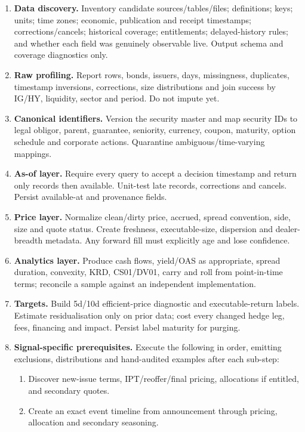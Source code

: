 \documentclass[10pt]{article}
\begin{document}
\begin{enumerate}[leftmargin=2em,label=\textbf{A\arabic*.}]
\item \textbf{Data discovery.} Inventory candidate sources/tables/files; definitions; keys; units; time zones; economic, publication and receipt timestamps; corrections/cancels; historical coverage; entitlements; delayed-history rules; and whether each field was genuinely observable live. Output schema and coverage diagnostics only.
\item \textbf{Raw profiling.} Report rows, bonds, issuers, days, missingness, duplicates, timestamp inversions, corrections, size distributions and join success by IG/HY, liquidity, sector and period. Do not impute yet.
\item \textbf{Canonical identifiers.} Version the security master and map security IDs to legal obligor, parent, guarantee, seniority, currency, coupon, maturity, option schedule and corporate actions. Quarantine ambiguous/time-varying mappings.
\item \textbf{As-of layer.} Require every query to accept a decision timestamp and return only records then available. Unit-test late records, corrections and cancels. Persist available-at and provenance fields.
\item \textbf{Price layer.} Normalize clean/dirty price, accrued, spread convention, side, size and quote status. Create freshness, executable-size, dispersion and dealer-breadth metadata. Any forward fill must explicitly age and lose confidence.
\item \textbf{Analytics layer.} Produce cash flows, yield/OAS as appropriate, spread duration, convexity, KRD, CS01/DV01, carry and roll from point-in-time terms; reconcile a sample against an independent implementation.
\item \textbf{Targets.} Build 5d/10d efficient-price diagnostic and executable-return labels. Estimate residualisation only on prior data; cost every changed hedge leg, fees, financing and impact. Persist label maturity for purging.
\item \textbf{Signal-specific prerequisites.} Execute the following in order, emitting exclusions, distributions and hand-audited examples after each sub-step:
\begin{enumerate}[label=\alph*)]
\item Discover new-issue terms, IPT/reoffer/final pricing, allocations if entitled, and secondary quotes.
\item Create an exact event timeline from announcement through pricing, allocation and secondary seasoning.

\end{enumerate}
\end{enumerate}
\end{document}
